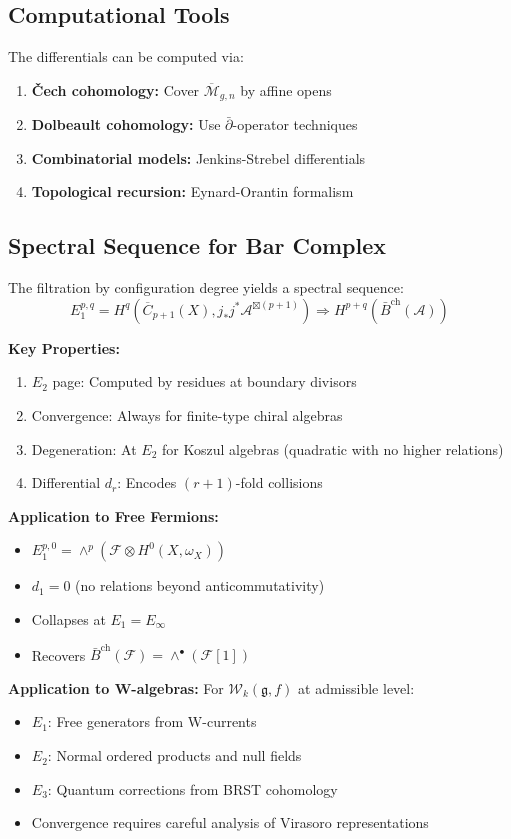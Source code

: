 \subsection{Computational Tools}

The differentials can be computed via:
\begin{enumerate}
\item \textbf{Čech cohomology:} Cover $\overline{\mathcal{M}}_{g,n}$ by affine opens
\item \textbf{Dolbeault cohomology:} Use $\bar{\partial}$-operator techniques
\item \textbf{Combinatorial models:} Jenkins-Strebel differentials
\item \textbf{Topological recursion:} Eynard-Orantin formalism
\end{enumerate}

\subsection{Spectral Sequence for Bar Complex}

\begin{theorem}
The filtration by configuration degree yields a spectral sequence:
$$E_1^{p,q} = H^q(\overline{C}_{p+1}(X), j_*j^*\mathcal{A}^{\boxtimes(p+1)}) \Rightarrow H^{p+q}(\bar{B}^{\text{ch}}(\mathcal{A}))$$

\textbf{Key Properties:}
\begin{enumerate}
\item $E_2$ page: Computed by residues at boundary divisors
\item Convergence: Always for finite-type chiral algebras
\item Degeneration: At $E_2$ for Koszul algebras (quadratic with no higher relations)
\item Differential $d_r$: Encodes $(r+1)$-fold collisions
\end{enumerate}

\textbf{Application to Free Fermions:}
\begin{itemize}
\item $E_1^{p,0} = \wedge^p(\mathcal{F} \otimes H^0(X, \omega_X))$ 
\item $d_1 = 0$ (no relations beyond anticommutativity)
\item Collapses at $E_1 = E_{\infty}$
\item Recovers $\bar{B}^{\text{ch}}(\mathcal{F}) = \wedge^{\bullet}(\mathcal{F}[1])$
\end{itemize}

\textbf{Application to W-algebras:}
For $\mathcal{W}_k(\mathfrak{g}, f)$ at admissible level:
\begin{itemize}
\item $E_1$: Free generators from W-currents
\item $E_2$: Normal ordered products and null fields
\item $E_3$: Quantum corrections from BRST cohomology
\item Convergence requires careful analysis of Virasoro representations
\end{itemize}
\end{theorem}

